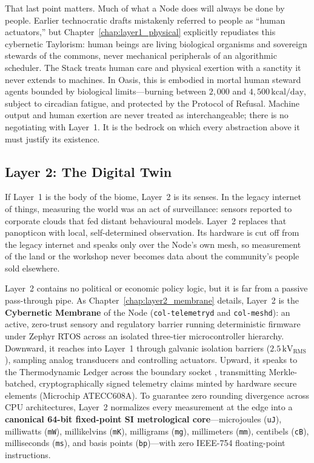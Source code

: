 That last point matters. Much of what a Node does will always be done by people. Earlier technocratic drafts mistakenly referred to people as ``human actuators,'' but Chapter~\ref{chap:layer1_physical} explicitly repudiates this cybernetic Taylorism: human beings are living biological organisms and sovereign stewards of the commons, never mechanical peripherals of an algorithmic scheduler. The Stack treats human care and physical exertion with a sanctity it never extends to machines. In Oasis, this is embodied in mortal human steward agents bounded by biological limits---burning between $2{,}000$ and $4{,}500\,\mathrm{kcal/day}$, subject to circadian fatigue, and protected by the Protocol of Refusal. Machine output and human exertion are never treated as interchangeable; there is no negotiating with Layer~1. It is the bedrock on which every abstraction above it must justify its existence.

\subsection{Layer 2: The Digital Twin}

If Layer~1 is the body of the biome, Layer~2 is its senses. In the legacy internet of things, measuring the world was an act of surveillance: sensors reported to corporate clouds that fed distant behavioural models. Layer~2 replaces that panopticon with local, self-determined observation. Its hardware is cut off from the legacy internet and speaks only over the Node's own mesh, so measurement of the land or the workshop never becomes data about the community's people sold elsewhere.

Layer~2 contains no political or economic policy logic, but it is far from a passive pass-through pipe. As Chapter~\ref{chap:layer2_membrane} details, Layer~2 is the \textbf{Cybernetic Membrane} of the Node (\texttt{col-telemetryd} and \texttt{col-meshd}): an active, zero-trust sensory and regulatory barrier running deterministic firmware under Zephyr RTOS across an isolated three-tier microcontroller hierarchy. Downward, it reaches into Layer~1 through galvanic isolation barriers ($2.5\,\mathrm{kV}_{\mathrm{RMS}}$), sampling analog transducers and controlling actuators. Upward, it speaks to the Thermodynamic Ledger across the boundary socket , transmitting Merkle-batched, cryptographically signed telemetry claims minted by hardware secure elements (Microchip ATECC608A). To guarantee zero rounding divergence across CPU architectures, Layer~2 normalizes every measurement at the edge into a \textbf{canonical 64-bit fixed-point SI metrological core}---microjoules (\texttt{uJ}), milliwatts (\texttt{mW}), millikelvins (\texttt{mK}), milligrams (\texttt{mg}), millimeters (\texttt{mm}), centibels (\texttt{cB}), milliseconds (\texttt{ms}), and basis points (\texttt{bp})---with zero IEEE-754 floating-point instructions.

